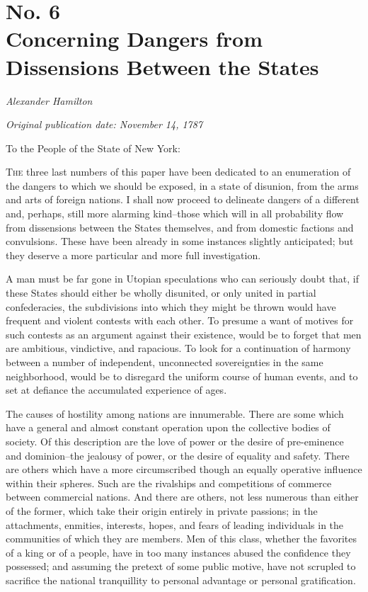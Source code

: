 \chapter[No. 6: Concerning Dangers from Dissensions Between the States]{No. 6\\ {\small Concerning Dangers from Dissensions Between the States}}

\textit{Alexander Hamilton}

\textit{Original publication date: November 14, 1787}
\vspace{1cm}

To the People of the State of New York:
\vspace{.4cm}

\textsc{The} three last numbers of this paper have been dedicated to an enumeration of the dangers to which we should be exposed, in a state of disunion, from the arms and arts of foreign nations. 
I shall now proceed to delineate dangers of a different and, perhaps, still more alarming kind--those which will in all probability flow from dissensions between the States themselves, and from domestic factions and convulsions. 
These have been already in some instances slightly anticipated; but they deserve a more particular and more full investigation.

A man must be far gone in Utopian speculations who can seriously doubt that, if these States should either be wholly disunited, or only united in partial confederacies, the subdivisions into which they might be thrown would have frequent and violent contests with each other. 
To presume a want of motives for such contests as an argument against their existence, would be to forget that men are ambitious, vindictive, and rapacious. 
To look for a continuation of harmony between a number of independent, unconnected sovereignties in the same neighborhood, would be to disregard the uniform course of human events, and to set at defiance the accumulated experience of ages.

The causes of hostility among nations are innumerable. 
There are some which have a general and almost constant operation upon the collective bodies of society. 
Of this description are the love of power or the desire of pre-eminence and dominion--the jealousy of power, or the desire of equality and safety. 
There are others which have a more circumscribed though an equally operative influence within their spheres. 
Such are the rivalships and competitions of commerce between commercial nations. 
And there are others, not less numerous than either of the former, which take their origin entirely in private passions; in the attachments, enmities, interests, hopes, and fears of leading individuals in the communities of which they are members. 
Men of this class, whether the favorites of a king or of a people, have in too many instances abused the confidence they possessed; and assuming the pretext of some public motive, have not scrupled to sacrifice the national tranquillity to personal advantage or personal gratification.

